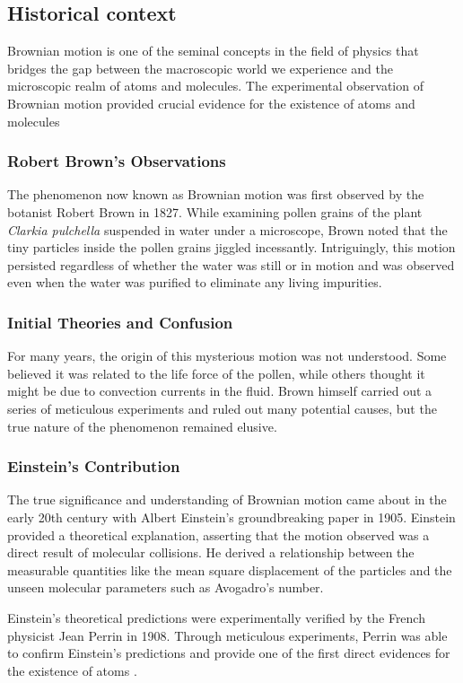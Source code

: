 \documentclass[10pt,letterpaper,onecolumn]{article}
\begin{document}
\subsection{Historical context}
Brownian motion is one of the seminal concepts in the field of physics that bridges the gap between the macroscopic world we experience and the microscopic realm of atoms and molecules. The experimental observation of Brownian motion provided crucial evidence for the existence of atoms and molecules \cite{brown1828}
\subsubsection{Robert Brown's Observations}
The phenomenon now known as Brownian motion was first observed by the botanist Robert Brown in 1827. While examining pollen grains of the plant \textit{Clarkia pulchella} suspended in water under a microscope, Brown noted that the tiny particles inside the pollen grains jiggled incessantly. Intriguingly, this motion persisted regardless of whether the water was still or in motion and was observed even when the water was purified to eliminate any living impurities.

\subsubsection{Initial Theories and Confusion}
For many years, the origin of this mysterious motion was not understood. Some believed it was related to the life force of the pollen, while others thought it might be due to convection currents in the fluid. Brown himself carried out a series of meticulous experiments and ruled out many potential causes, but the true nature of the phenomenon remained elusive.

\subsubsection{Einstein's Contribution}
The true significance and understanding of Brownian motion came about in the early 20th century with Albert Einstein's groundbreaking paper in 1905. Einstein provided a theoretical explanation, asserting that the motion observed was a direct result of molecular collisions. He derived a relationship between the measurable quantities like the mean square displacement of the particles and the unseen molecular parameters such as Avogadro's number.

Einstein's theoretical predictions were experimentally verified by the French physicist Jean Perrin in 1908. Through meticulous experiments, Perrin was able to confirm Einstein's predictions and provide one of the first direct evidences for the existence of atoms \cite{einstein1905}.
\end{document}
